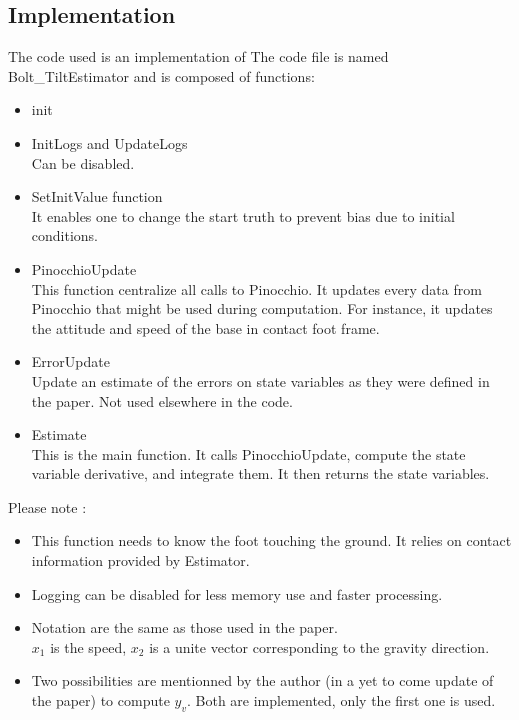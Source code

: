 \documentclass[a4paper,10pt]{article}
\begin{document}
\subsection{Implementation}
The code used is an implementation of \cite{8}
The code file is named Bolt\_TiltEstimator and is composed of functions:
\begin{itemize}
	\item{init}
	\item{InitLogs and UpdateLogs\\Can be disabled.}
	\item{SetInitValue function\\ It enables one to change the start truth to prevent bias due to initial conditions.}
	\item{PinocchioUpdate\\This function centralize all calls to Pinocchio. It updates every data from Pinocchio that might be used during computation. For instance, it updates the attitude and speed of the base in contact foot frame.}
	\item{ErrorUpdate\\ Update an estimate of the errors on state variables as they were defined in the paper. Not used elsewhere in the code.}
	\item{Estimate\\This is the main function. It calls PinocchioUpdate, compute the state variable derivative, and integrate them. It then returns the state variables.}
\end{itemize}

Please note :\\

\begin{itemize}[noitemsep,topsep=0.5pt,parsep=0.1pt,partopsep=0.1pt]
	\item{This function needs to know the foot touching the ground. It relies on contact information provided by Estimator.}
	\item{Logging can be disabled for less memory use and faster processing.}
	\item{Notation are the same as those used in the paper.\\ $x_1$ is the speed, $x_2$ is a unite vector corresponding to the gravity direction.}
	\item{Two possibilities are mentionned by the author (in a yet to come update of the paper) to compute $y_v$. Both are implemented, only the first one is used.}
	
\end{itemize}
\end{document}
